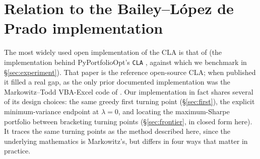 \documentclass[11pt]{article}
\begin{document}
\section{Relation to the Bailey--L\'opez de Prado implementation}
\label{sec:bailey}

The most widely used open implementation of the CLA is that of
\citet{bailey2013} (the implementation behind PyPortfolioOpt's \texttt{CLA}
\citep{pyportfolioopt}, against which we benchmark in \S\ref{sec:experiment}).
That paper is the reference open-source CLA; when published it filled a real gap,
as the only prior documented implementation was the Markowitz--Todd VBA-Excel code
of \citet{markowitz2000}. Our
implementation in fact shares several of its design choices: the same greedy
first turning point (\S\ref{sec:first}), the explicit minimum-variance endpoint
at $\lambda = 0$, and locating the maximum-Sharpe portfolio between bracketing
turning points (\S\ref{sec:frontier}, in closed form here). It traces the same
turning points as the method described here, since the underlying mathematics is
Markowitz's, but differs in four ways that matter in practice.
\end{document}
